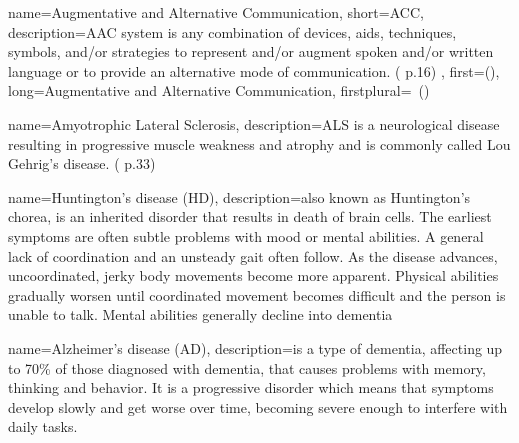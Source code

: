  {
	name={Augmentative and Alternative Communication}, 
	short={ACC},
	description={AAC system is any combination of devices, aids, techniques, symbols, and/or strategies to represent and/or augment spoken and/or written language or to provide an alternative mode of communication. (\cite{SLPathologies} p.16)
},
first={}(),
	long={Augmentative and Alternative Communication},
	firstplural={\glspluralsuffix\ (\glspluralsuffix )}
}

 {
	name={Amyotrophic Lateral Sclerosis}, 
	description={ALS is a neurological disease resulting in progressive muscle weakness and atrophy and is commonly called Lou Gehrig's disease. (\cite{SLPathologies} p.33)
}%
}




 {
	name={Huntington's disease (HD)}, 
	description={also known as Huntington's chorea, is an inherited disorder that results in death of brain cells. The earliest symptoms are often subtle problems with mood or mental abilities. A general lack of coordination and an unsteady gait often follow. As the disease advances, uncoordinated, jerky body movements become more apparent. Physical abilities gradually worsen until coordinated movement becomes difficult and the person is unable to talk. Mental abilities generally decline into dementia~\cite{Dayalu2015huntington}}
}





 {
	name={Alzheimer's disease (AD)}, 
	description={is a type of dementia, affecting up to 70\% of those diagnosed with dementia, that causes problems with memory, thinking and behavior. It is a progressive disorder which means that symptoms develop slowly and get worse over time, becoming severe enough to interfere with daily tasks.}
}


